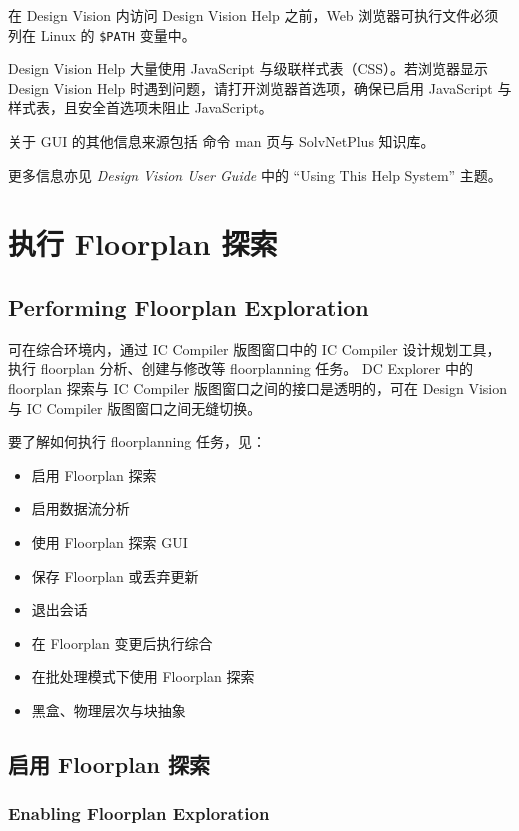 \begin{noteBox}
在 Design Vision 内访问 Design Vision Help 之前，Web 浏览器可执行文件必须列在 Linux 的 \texttt{\$PATH} 变量中。

Design Vision Help 大量使用 JavaScript 与级联样式表（CSS）。若浏览器显示 Design Vision Help 时遇到问题，请打开浏览器首选项，确保已启用 JavaScript 与样式表，且安全首选项未阻止 JavaScript。
\end{noteBox}

关于 GUI 的其他信息来源包括  命令 man 页与 SolvNetPlus 知识库。

更多信息亦见 \textit{Design Vision User Guide} 中的 ``Using This Help System'' 主题。

\section{执行 Floorplan 探索}
\subsection*{Performing Floorplan Exploration}

可在综合环境内，通过 IC Compiler 版图窗口中的 IC Compiler 设计规划工具，执行 floorplan 分析、创建与修改等 floorplanning 任务。
DC Explorer 中的 floorplan 探索与 IC Compiler 版图窗口之间的接口是透明的，可在 Design Vision 与 IC Compiler 版图窗口之间无缝切换。

要了解如何执行 floorplanning 任务，见：
\begin{itemize}
  \item 启用 Floorplan 探索
  \item 启用数据流分析
  \item 使用 Floorplan 探索 GUI
  \item 保存 Floorplan 或丢弃更新
  \item 退出会话
  \item 在 Floorplan 变更后执行综合
  \item 在批处理模式下使用 Floorplan 探索
  \item 黑盒、物理层次与块抽象
\end{itemize}

\subsection{启用 Floorplan 探索}
\subsubsection*{Enabling Floorplan Exploration}


